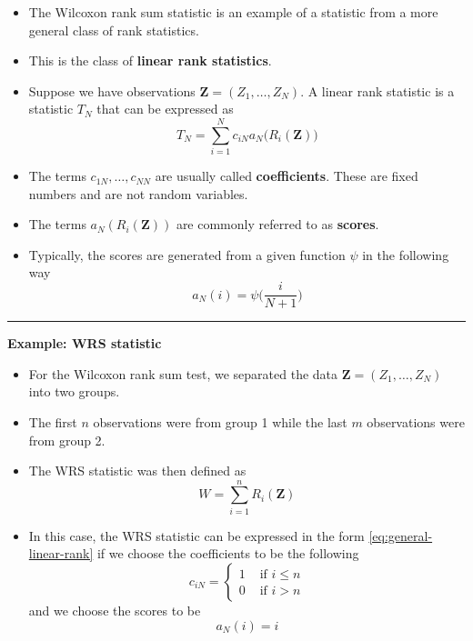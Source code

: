 \documentclass[]{book}
\begin{document}
\begin{itemize}
\item
  The Wilcoxon rank sum statistic is an example of a statistic from a more general class of rank statistics.
\item
  This is the class of \textbf{linear rank statistics}.
\item
  Suppose we have observations \(\mathbf{Z} = (Z_{1}, \ldots, Z_{N})\).
  A linear rank statistic is a statistic \(T_{N}\) that can be expressed as
  \begin{equation}
  T_{N} = \sum_{i=1}^{N} c_{iN} a_{N}\big( R_{i}( \mathbf{Z} ) \big)
  \label{eq:general-linear-rank}
  \end{equation}
\item
  The terms \(c_{1N}, \ldots, c_{NN}\) are usually called \textbf{coefficients}. These
  are fixed numbers and are not random variables.
\item
  The terms \(a_{N}(R_{i}( \mathbf{Z} ) )\) are commonly referred to as \textbf{scores}.
\item
  Typically, the scores are generated from a given function \(\psi\) in
  the following way
  \begin{equation}
  a_{N}(i) = \psi\Big( \frac{i}{N+1} \Big) 
  \end{equation}
\end{itemize}

\begin{center}\rule{0.5\linewidth}{\linethickness}\end{center}

\textbf{Example: WRS statistic }

\begin{itemize}
\item
  For the Wilcoxon rank sum test, we separated the data \(\mathbf{Z} = (Z_{1}, \ldots, Z_{N})\)
  into two groups.
\item
  The first \(n\) observations were from group 1 while the
  last \(m\) observations were from group 2.
\item
  The WRS statistic was then defined as
  \begin{equation}
  W = \sum_{i=1}^{n} R_{i}(\mathbf{Z})
  \end{equation}
\item
  In this case, the WRS statistic can be expressed in the form \eqref{eq:general-linear-rank}
  if we choose the coefficients to be the following
  \begin{equation}
  c_{iN} = \begin{cases}
   1 & \textrm{ if } i \leq n \\
   0 & \textrm{ if } i > n 
   \end{cases}
  \end{equation}
  and we choose the scores to be
  \begin{equation}
  a_{N}(i) = i
  \end{equation}
\end{itemize}
\end{document}
